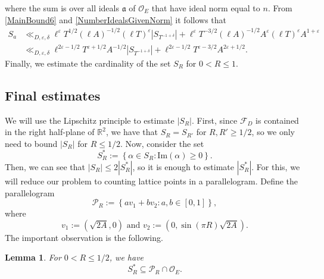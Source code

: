 \documentclass[11pt]{amsart}
\newcommand{\bigo}{\mathcal{O}}
\newcommand{\R}{\mathbb{R}}
\newtheorem{lemma}[theorem]{Lemma}
\theoremstyle{definition}
\theoremstyle{remark}
\begin{document}
where the sum is over all ideals $\mathfrak{a}$ of $\bigo_E$ that have ideal norm equal to $n$. From \eqref{MainBound6} and \eqref{NumberIdealsGivenNorm} it follows that
\begin{align}
    S_a &\ll_{D,\varepsilon,\delta} \ell^{\varepsilon} T^{1/2} (\ell A)^{-1/2} (\ell T)^{\varepsilon} \left| S_{T^{-1+\delta}} \right| + \ell^{\varepsilon} T^{-3/2} (\ell A)^{-1/2} A^{\varepsilon} (\ell T)^{\varepsilon} A^{1+\varepsilon} \label{MainBound7} \\
    &\ll_{D,\varepsilon,\delta} \ell^{2\varepsilon-1/2} T^{\varepsilon + 1/2} A^{-1/2} \left| S_{T^{-1+\delta}} \right| + \ell^{2\varepsilon - 1/2} T^{\varepsilon - 3/2} A^{2\varepsilon + 1/2}. \nonumber
\end{align}
Finally, we estimate the cardinality of the set $S_{R}$ for $0< R \leq 1$.




\subsection{Final estimates}

We will use the Lipschitz principle to estimate $|S_{R}|$. First, since $\mathcal{F}_{D}$ is contained in the right half-plane of $\R^2$, we have that $S_{R} = S_{R'}$ for $R,R'\geq 1/2$, so we only need to bound $|S_{R}|$ for $R\leq 1/2$. Now, consider the set $$ S_{R}^{*} := \left\{ \alpha \in S_{R} : \mathrm{Im}(\alpha)\geq 0 \right\}.$$ Then, we can see that $|S_{R}| \leq 2|S_{R}^{*}|$, so it is enough to estimate $|S_{R}^{*}|$. For this, we will reduce our problem to counting lattice points in a parallelogram. Define the parallelogram $$ \mathcal{P}_{R} := \left\{ av_1 + bv_2 : a,b\in [0,1] \right\},$$ where $$ v_1 := \left( \sqrt{2A}, 0 \right) \text{ and } v_2 := \left( 0, \sin\left(\pi R\right) \sqrt{2A} \right).$$ The important observation is the following.

\begin{lemma}\label{SxiInsideParallelogram}
For $0< R\leq 1/2$, we have $$ S_{R}^{*} \subseteq \mathcal{P}_{R} \cap \bigo_E.$$
\end{lemma}
\end{document}
